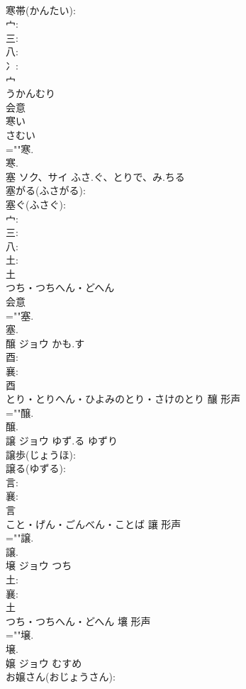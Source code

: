 \documentclass[8pt]{extreport}
\begin{document}
\begin{CJK}{UTF8}{min}
\\	寒帯(かんたい): 
\\	宀: 
\\	三: 
\\	八: 
\\	冫: 
\\	宀	
\\	うかんむり	
\\	会意 
\\	寒い　
\\	さむい　
\\	=""寒.
\\	寒.
\\	塞	ソク、サイ	ふさ.ぐ、とりで、み.ちる		
\\	塞がる(ふさがる): 
\\	塞ぐ(ふさぐ): 
\\	宀: 
\\	三: 
\\	八: 
\\	土: 
\\	土	
\\	つち・つちへん・どへん	
\\	会意 
\\	=""塞.
\\	塞.
\\	醸	ジョウ	かも.す		
\\	酉: 
\\	襄: 
\\	酉	
\\	とり・とりへん・ひよみのとり・さけのとり	釀	形声 
\\	=""醸.
\\	醸.
\\	譲	ジョウ	ゆず.る	ゆずり	
\\	譲歩(じょうほ): 
\\	譲る(ゆずる): 
\\	言: 
\\	襄: 
\\	言	
\\	こと・げん・ごんべん・ことば	讓	形声 
\\	=""譲.
\\	譲.
\\	壌	ジョウ	つち		
\\	土: 
\\	襄: 
\\	土	
\\	つち・つちへん・どへん	壤	形声 
\\	=""壌.
\\	壌.
\\	嬢	ジョウ	むすめ		
\\	お嬢さん(おじょうさん): 

\end{CJK}
\end{document}
